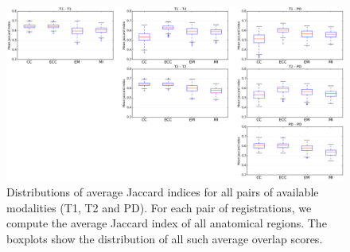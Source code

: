 \begin{figure}[t!]
\centering
    \includegraphics[width=\linewidth]{./images/all_modality_pairs_boxplots.png}
    \caption{Distributions of average Jaccard indices for all pairs of available modalities (T1, T2 and PD). For each pair of registrations, we compute the average Jaccard index of all anatomical regions. The boxplots show the distribution of all such average overlap scores.}
\label{fig:all_pairs_boxplots}
\end{figure}

